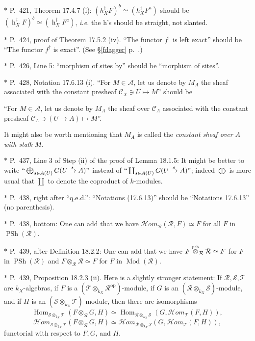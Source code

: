 \documentclass[12pt]{article}
\theoremstyle{remark}
\theoremstyle{definition}
\newcommand{\nn}{\noindent}
\newcommand{\cc}{\mathcal}
\newcommand{\oo}{\operatorname}
\newcommand{\A}{\mathcal A}
\newcommand{\C}{\mathcal C}
\newcommand{\HOM}{\cc H\!\mathit{om}}
\newcommand{\xr}{\xrightarrow}
\DeclareMathOperator{\Hom}{Hom}
\DeclareMathOperator{\Mod}{Mod}
\DeclareMathOperator{\op}{op}
\begin{document}
\nn$*$ P.~421, Theorem 17.4.7 (i): $(h_X^\ddagger F)^b\simeq(h_X^\ddagger F^a)$ should be $(\oo h_X^\ddagger F)^b\simeq(\oo h_X^\ddagger F^a)$, \emph{i.e.} the h's should be straight, not slanted.

\nn$*$ P.~424, proof of Theorem 17.5.2 (iv). ``The functor $f^\dagger$ is left exact'' should be ``The functor $f^\dagger$ is exact''. (See \S\ref{fdagger} p.~\pageref{fdagger}.) 

\nn$*$ P.~426, Line 5: ``morphism of sites by'' should be ``morphism of sites''.

\nn$*$ P.~428, Notation 17.6.13 (i). ``For $M\in\A$, let us denote by $M_A$ the sheaf associated with the constant presheaf $\C_X\ni U\mapsto M$'' should be  

``For $M\in\A$, let us denote by $M_A$ the sheaf over $\C_A$ associated with the constant presheaf $\C_A\ni(U\to A)\mapsto M$''. 

It might also be worth mentioning that $M_A$ is called the \emph{constant sheaf over $A$ with stalk} $M$. 

\nn$*$ P.~437, Line 3 of Step (ii) of the proof of Lemma 18.1.5: It might be better to write $``\bigoplus_{s\in A(U)}G(U\xr sA)"$ instead of $``\coprod_{s\in A(U)}G(U\xr sA)"$; indeed $\bigoplus$ is more usual that $\coprod$ to denote the coproduct of $k$-modules. 

\nn$*$ P.~438, right after ``q.e.d.'': ``Notations (17.6.13)'' should be ``Notations 17.6.13'' (no parenthesis). 

\nn$*$ P.~438, bottom: One can add that we have $\HOM_{\cc R}(\cc R,F)\simeq F$ for all $F$ in $\oo{PSh}(\cc R)$. 

\nn$*$ P.~439, after Definition 18.2.2: One can add that we have $F\overset{\text{\tiny psh}}{\otimes}_{\cc R}\cc R\simeq F$ for $F$ in $\oo{PSh}(\cc R)$ and $F\otimes_{\cc R}\cc R\simeq F$ for $F$ in $\Mod(\cc R)$. 

\nn$*$ P.~439, Proposition 18.2.3 (ii). Here is a slightly stronger statement: If $\cc{R,S,T}$ are $k_X$-algebras, if $F$ is a $(\cc T\otimes_{k_X}\cc R^{\op})$-module, if $G$ is an $(\cc R\otimes_{k_X}\cc S)$-module, and if $H$ is an $(\cc S\otimes_{k_X}\cc T)$-module, then there are isomorphisms 
$$
\Hom_{\cc S\otimes_{k_X}\cc T}(F\otimes_{\cc R}G,H)\simeq
\Hom_{\cc R\otimes_{k_X}\cc S}(G,\HOM_{\cc T}(F,H)), 
$$ 
$$
\HOM_{\cc S\otimes_{k_X}\cc T}(F\otimes_{\cc R}G,H)\simeq
\HOM_{\cc R\otimes_{k_X}\cc S}(G,\HOM_{\cc T}(F,H)), 
$$ 
functorial with respect to $F,G$, and $H$.
\end{document}
